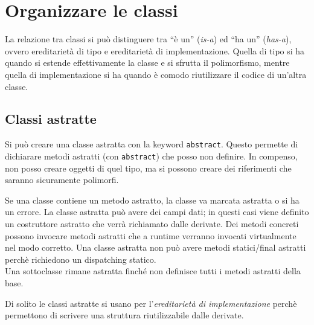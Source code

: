 \chapter{Organizzare le classi}

La relazione tra classi si può distinguere tra “è un” (\textit{is-a}) ed “ha un” (\textit{has-a}), ovvero ereditarietà di tipo e ereditarietà di implementazione. Quella di tipo si ha quando si estende effettivamente la classe e si sfrutta il polimorfismo, mentre quella di implementazione si ha quando è comodo riutilizzare il codice di un'altra classe.
\section{Classi astratte}
Si può creare una classe astratta con la keyword \texttt{abstract}. Questo permette di dichiarare metodi astratti (con \texttt{abstract}) che posso non definire. In compenso, non posso creare oggetti di quel tipo, ma si possono creare dei riferimenti che saranno sicuramente polimorfi.

Se una classe contiene un metodo astratto, la classe va marcata astratta o si ha un errore.
La classe astratta può avere dei campi dati; in questi casi viene definito un costruttore astratto che verrà richiamato dalle derivate.
Dei metodi concreti possono invocare metodi astratti che a runtime verranno invocati virtualmente nel modo corretto.
Una classe astratta non può avere metodi statici/final astratti perchè richiedono un dispatching statico. \\
Una sottoclasse rimane astratta finché non definisce tutti i metodi astratti della base.

Di solito le classi astratte si usano per l'\textit{ereditarietà di implementazione} perchè permettono di scrivere una struttura riutilizzabile dalle derivate.

